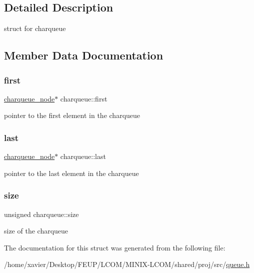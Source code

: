 \subsection{Detailed Description}
struct for charqueue 

\subsection{Member Data Documentation}
\mbox{\label{structcharqueue_abb7dc7337962f3271ebf4de73def3d50}} 
\subsubsection{\texorpdfstring{first}{first}}
{\footnotesize\ttfamily \hyperlink{structcharqueue__node}{charqueue\+\_\+node}$\ast$ charqueue\+::first}



pointer to the first element in the charqueue 

\mbox{\label{structcharqueue_aa3de86477958821f7b9eb00fd0a49da6}} 
\subsubsection{\texorpdfstring{last}{last}}
{\footnotesize\ttfamily \hyperlink{structcharqueue__node}{charqueue\+\_\+node}$\ast$ charqueue\+::last}



pointer to the last element in the charqueue 

\mbox{\label{structcharqueue_ac922520c1a6c8a25cc334530cd53c00c}} 
\subsubsection{\texorpdfstring{size}{size}}
{\footnotesize\ttfamily unsigned charqueue\+::size}



size of the charqueue 



The documentation for this struct was generated from the following file\+:\begin{DoxyCompactItemize}
\item 
/home/xavier/\+Desktop/\+F\+E\+U\+P/\+L\+C\+O\+M/\+M\+I\+N\+I\+X-\/\+L\+C\+O\+M/shared/proj/src/\hyperlink{queue_8h}{queue.\+h}\end{DoxyCompactItemize}
